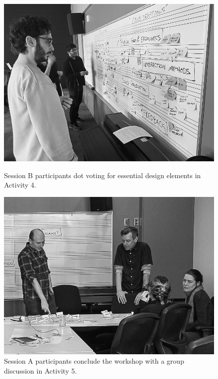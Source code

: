 \documentclass[letterpaper, 12pt]{article}
\begin{document}
\begin{figure}[htbp]
    \begin{minipage}{0.49\textwidth}
        \centering
        \includegraphics[width=1\textwidth]{dfp_dot_voting_B.jpg}
        \caption[Design for Performance workshop: Activity 4 - Dot voting]{Session B participants dot voting for essential design elements in Activity 4.}
        \label{fig:dot-voting}
    \end{minipage}\hfill
    \begin{minipage}{0.49\textwidth}
        \centering
        \includegraphics[width=1\textwidth]{dfp_discussion_A.jpg}
        \caption[Design for Performance workshop: Activity 5 - Discussion]{Session A participants conclude the workshop with a group discussion in Activity 5.}
        \label{fig:discussion}
    \end{minipage}
\end{figure}
\end{document}
